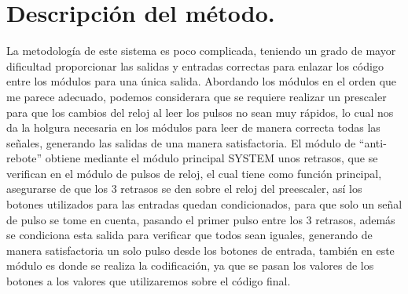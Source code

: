 \documentclass[a4paper, 12pt]{article}
\begin{document}
    \section{Descripción del método.}
    La metodología de este sistema es poco complicada, teniendo un grado de mayor dificultad proporcionar las salidas y entradas correctas para enlazar los código entre los módulos para una única salida.
    Abordando los módulos en el orden que me parece adecuado, podemos considerara que se requiere realizar un prescaler para que los cambios del reloj al leer los pulsos no sean muy rápidos, lo cual nos da la holgura necesaria en los módulos para leer de manera correcta todas las señales, generando las salidas de una manera satisfactoria. El módulo de “anti-rebote” obtiene mediante el módulo principal SYSTEM unos retrasos, que se verifican en el módulo de pulsos de reloj, el cual tiene como función principal, asegurarse de que los 3 retrasos se den sobre el reloj del preescaler, así los botones utilizados para las entradas quedan condicionados,  para que solo un señal de pulso se tome en cuenta, pasando el primer pulso entre los 3 retrasos, además se condiciona esta salida para verificar que todos sean iguales, generando de manera satisfactoria un solo pulso desde los botones de entrada, también en este módulo es donde se realiza la codificación, ya que se pasan los valores de los botones a los valores que utilizaremos  sobre el código final.
\end{document}
